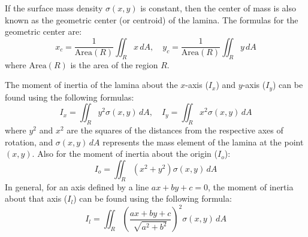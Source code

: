 \documentclass[11pt]{report}
\begin{document}
\begin{definition}
    If the surface mass density $\sigma(x,y)$ is constant, then the center of mass is also known as the geometric center (or centroid) of the lamina. The formulas for the geometric center are:
    \begin{equation}
        x_c = \frac{1}{\text{Area}(R)} \iint_R x \, dA, \quad y_c = \frac{1}{\text{Area}(R)} \iint_R y \, dA
    \end{equation}
    where $\text{Area}(R)$ is the area of the region $R$.
    
\end{definition}

\begin{definition}
    The moment of inertia of the lamina about the $x$-axis ($I_x$) and $y$-axis ($I_y$) can be found using the following formulas:
    \begin{equation}
        I_x = \iint_R y^2 \sigma(x,y) \, dA, \quad I_y = \iint_R x^2 \sigma(x,y) \, dA
    \end{equation}
    where $y^2$ and $x^2$ are the squares of the distances from the respective axes of rotation, and $\sigma(x,y) \, dA$ represents the mass element of the lamina at the point $(x,y)$. Also for the moment of inertia about the origin ($I_o$):
    \begin{equation}
        I_o = \iint_R (x^2 + y^2) \sigma(x,y) \, dA
    \end{equation}
    In general, for an axis defined by a line $ax + by + c = 0$, the moment of inertia about that axis ($I_l$) can be found using the following formula:
    \begin{equation}
        I_l = \iint_R \left( \frac{ax + by + c}{\sqrt{a^2 + b^2}} \right)^2 \sigma(x,y) \, dA
    \end{equation}
\end{definition}
\end{document}
